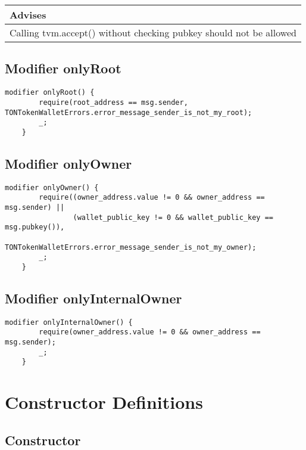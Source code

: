 \ifsoldraft
\noindent\begin{tabular}{|p{12cm}|}\hline
\rowcolor{green}Advises
\\\hline
Calling tvm.accept() without checking pubkey should not be allowed
\\\hline\end{tabular}
\fi

\subsection{Modifier onlyRoot}


\begin{lstlisting}[firstnumber=598]
    modifier onlyRoot() {
        require(root_address == msg.sender, TONTokenWalletErrors.error_message_sender_is_not_my_root);
        _;
    }
\end{lstlisting}

\subsection{Modifier onlyOwner}


\begin{lstlisting}[firstnumber=603]
    modifier onlyOwner() {
        require((owner_address.value != 0 && owner_address == msg.sender) ||
                (wallet_public_key != 0 && wallet_public_key == msg.pubkey()),
                TONTokenWalletErrors.error_message_sender_is_not_my_owner);
        _;
    }
\end{lstlisting}

\subsection{Modifier onlyInternalOwner}


\begin{lstlisting}[firstnumber=610]
    modifier onlyInternalOwner() {
        require(owner_address.value != 0 && owner_address == msg.sender);
        _;
    }
\end{lstlisting}

\section{Constructor Definitions}


\subsection{Constructor}

